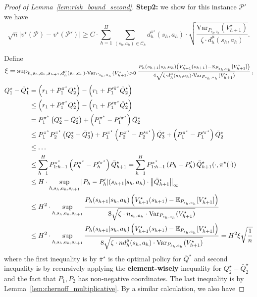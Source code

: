 \begin{proof}[Proof of Lemma~\ref{lem:risk_bound_second}]
\textbf{Step2:} we show for this instance $\mathcal{P}'$ we have 
\[
\sqrt{n}|v^\star(\mathcal{P})-v^\star(\mathcal{P}')|\geq C\cdot {\sum_{h=1}^H\sum_{(s_h,a_h)\in\mathcal{C}_h}d^{\pi^\star}_h(s_h,a_h)\cdot\sqrt{\frac{\mathrm{Var}_{P_{s_h,a_h}}(V^\star_{h+1})}{ \zeta\cdot d^\mu_h{(s_h,a_h)}}}}.
\]



Define $\xi=\sup_{h,s_h,a_h,s_{h+1}, d^\mu_h(s_h,a_h)\cdot \mathrm{Var}_{P_{s_h,a_h}}(V_{h+1}^\star)>0}\frac{P_h(s_{h+1}|s_h,a_h)\left(V_{h+1}^\star(s_{h+1})-\mathbb{E}_{P_{s_h,a_h}}[V_{h+1}^\star]\right)}{4\sqrt{\zeta\cdot  d^\mu_h(s_h,a_h)\cdot \mathrm{Var}_{P_{s_h,a_h}}(V_{h+1}^\star)}}$,
{\small
\begin{align*}
Q^\star_1-\bar{Q}_1^\star&=\left(r_1+P^{{\pi}^\star}_1{Q}_2^\star\right)-\left(r_1+P'^{\bar{\pi}^\star}_1\bar{Q}_2^\star\right)\\
&\leq \left(r_1+P^{{\pi}^\star}_1{Q}_2^\star\right)-\left(r_1+P'^{{\pi}^\star}_1\bar{Q}_2^\star\right)\\
&=P^{{\pi}^\star}_1\left({Q}_2^\star-\bar{Q}_2^\star\right)+\left(P^{{\pi}^\star}_1-P'^{{\pi}^\star}_1\right)\bar{Q}_2^\star\\
&\leq P^{{\pi}^\star}_1P^{{\pi}^\star}_2\left({Q}_3^\star-\bar{Q}_3^\star\right)+P^{{\pi}^\star}_1\left(P^{{\pi}^\star}_2-P'^{{\pi}^\star}_2\right)\bar{Q}_3^\star+\left(P^{{\pi}^\star}_1-P'^{{\pi}^\star}_1\right)\bar{Q}_2^\star\\
&\leq \ldots\\
&\leq \sum_{h=1}^H P^{{\pi}^\star}_{1:h-1}\left(P^{{\pi}^\star}_h-P'^{{\pi}^\star}_h\right)\bar{Q}_{h+1}^\star=\sum_{h=1}^H P^{{\pi}^\star}_{1:h-1}\left(P_h-P'_h\right)\bar{Q}_{h+1}^\star(\cdot,\pi^\star(\cdot))\\
&\leq H\cdot \sup_{h,s_h,a_h,s_{h+1}}|P_h-P'_h|(s_{h+1}|s_h,a_h)\cdot \left\lVert\bar{Q}_{h+1}^\star\right\rVert_\infty\\
&\leq H^2 \cdot \sup_{h,s_h,a_h,s_{h+1}}\frac{P_h(s_{h+1}|s_h,a_h)\left(V_{h+1}^\star(s_{h+1})-\mathbb{E}_{P_{s_h,a_h}}[V_{h+1}^\star]\right)}{8\sqrt{\zeta\cdot n_{s_h,a_h}\cdot \mathrm{Var}_{P_{s_h,a_h}}(V_{h+1}^\star)}}\\
&\leq H^2 \cdot \sup_{h,s_h,a_h,s_{h+1}}\frac{P_h(s_{h+1}|s_h,a_h)\left(V_{h+1}^\star(s_{h+1})-\mathbb{E}_{P_{s_h,a_h}}[V_{h+1}^\star]\right)}{8\sqrt{  \zeta\cdot n d^\mu_h(s_h,a_h)\cdot \mathrm{Var}_{P_{s_h,a_h}}(V_{h+1}^\star)}}=H^2\xi\sqrt{\frac{1}{n}}\\
\end{align*}
}where the first inequality is by $\bar{\pi}^\star$ is the optimal policy for $\bar{Q}^\star$ and second inequality is by recursively applying the \textbf{element-wisely} inequality for $Q^\star_2-\bar{Q}^\star_2$ and the fact that $P_1,P_2$ has non-negative coordinates. The last inequality is by Lemma~\ref{lem:chernoff_multiplicative}. By a similar calculation, we also have  

\end{proof}
